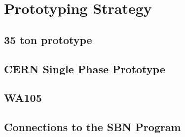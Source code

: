 \chapter{Prototyping Strategy}
\label{ch:detectors-proto}

\section{35 ton prototype}
\label{sec:detectors-proto-35t}

\section{CERN Single Phase Prototype}
\label{sec:detectors-proto-spcp}

\section{WA105}
\label{sec:detectors-proto-wa105}

\section{Connections to the SBN Program}
\label{sec:detectors-proto-sbn}

